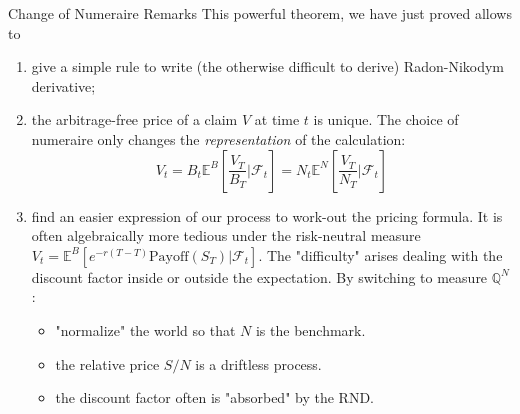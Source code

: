 \documentclass{beamer}
\begin{document}
	\begin{frame}{Change of Numeraire Remarks}
		This powerful theorem, we have just proved allows to
		\begin{enumerate}
			\item give a simple rule to write (the otherwise difficult to derive) Radon-Nikodym derivative;
			\item the arbitrage-free price of a claim $V$ at time $t$ is unique. The choice of numeraire only changes the \textit{representation} of the calculation:
			\begin{equation*}
				V_t = B_t \mathbb{E}^{B} \left[ \frac{V_T}{B_T} \bigg| \mathcal{F}_t \right] = N_t \mathbb{E}^{N} \left[ \frac{V_T}{N_T} \bigg| \mathcal{F}_t \right]
			\end{equation*}
			\item find an easier expression of our process to work-out the pricing formula. It is often algebraically more tedious under the risk-neutral measure $V_t=\mathbb{E}^{B}[e^{-r(T-T)}\text{Payoff}(S_T)|\mathcal{F}_t]$.
			The "difficulty" arises dealing with the discount factor inside or outside the expectation.
			By switching to measure $\mathbb{Q}^N$:
			 	\begin{itemize}
			 		\item "normalize" the world so that $N$ is the benchmark.
			 		\item the relative price $S/N$ is a \textcolor{maincolor}{driftless process}.
			 		\item the discount factor often is "absorbed" by the RND.
			 \end{itemize}
		\end{enumerate}
	\end{frame}
\end{document}
